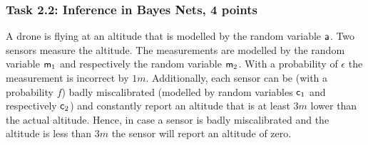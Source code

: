 \documentclass[12pt,a4paper,oneside]{article}
\begin{document}
%
%
\subsubsection*{Task 2.2: Inference in Bayes Nets, 4 points}

A drone is flying at an altitude that is modelled by the random variable
$\rv{a}$.  Two sensors measure the altitude. The measurements are modelled by
the random variable $\rv{m}_1$ and respectively the random variable $\rv{m}_2$.
With a probability of $\epsilon$ the measurement is incorrect by
$1m$. Additionally, each sensor can be (with a probability $f$) badly
miscalibrated (modelled by random variables $\rv{c}_1$ and respectively
$\rv{c}_2$) and constantly report an altitude that is at least $3m$ lower than
the actual altitude.  Hence, in case a sensor is badly miscalibrated and the
altitude is less than $3m$ the sensor will report an altitude of zero.
\end{document}
